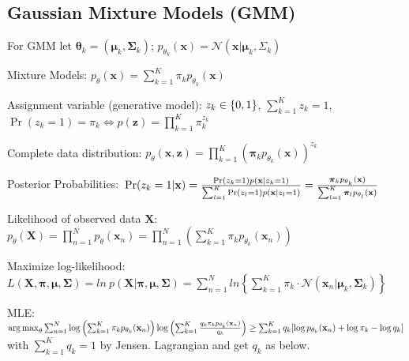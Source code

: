 \documentclass[a4paper, 11pt, landscape]{article}
\DeclareMathOperator*{\argmax}{arg\,max}
\begin{document}
\begin{multicols*}{3}
\section{Gaussian Mixture Models (GMM)}
For GMM let $\boldsymbol{\theta}_k = (\boldsymbol{\mu}_k, \boldsymbol{\Sigma}_k)$; $p_{\theta_k}(\mathbf{x}) = \mathcal{N}(\mathbf{x} | \boldsymbol{\mu}_k, \Sigma_k)$
\begin{compactdesc}
	\item[Mixture Models:] $p_\theta(\mathbf{x}) = \sum_{k=1}^K \pi_k p_{\theta_k}(\mathbf{x})$
	\item[Assignment variable (generative model):] $\\z_k \in \{0, 1\}$, $\sum_{k=1}^K z_k = 1$, $\operatorname{Pr}(z_k = 1) = \pi_k \Leftrightarrow p(\mathbf{z}) = \prod_{k=1}^K \pi_k^{z_k}$
	\item[Complete data distribution:] $p_\theta(\mathbf{x}, \mathbf{z}) = \prod_{k=1}^K \left( \boldsymbol{\pi}_k p_{\theta_k}(\mathbf{x})\right)^{z_k}$
	\item[Posterior Probabilities:] $\\\operatorname{Pr}(z_k = 1 | \mathbf{x}) = \frac{\operatorname{Pr}(z_k = 1) p(\mathbf{x} | z_k = 1)}{\sum_{l=1}^K \operatorname{Pr}(z_l = 1) p(\mathbf{x} | z_l = 1)} = \frac{\boldsymbol{\pi}_k p_{\theta_k}(\mathbf{x})}{\sum_{l=1}^K \boldsymbol{\pi}_l p_{\theta_l}(\mathbf{x})}$
	\item[Likelihood of observed data $\mathbf{X}$:] $p_\theta(\mathbf{X}) = \prod_{n=1}^N p_\theta(\mathbf{x}_n) = \prod_{n=1}^N \left(\sum_{k=1}^K \pi_k p_{\theta_k}(\mathbf{x}_n)\right)$
	\item[Maximize log-likelihood:] $L(\bm{X},\bm{\pi},\bm{\mu},\bm{\Sigma}) = ln\ p(\bm{X}|\bm{\pi},\bm{\mu},\bm{\Sigma}) = \sum^{N}_{n=1}ln \left\{ \sum^{K}_{k=1} \pi_k \cdot \mathcal{N} \left( \bm{x}_n | \bm{\mu}_k, \bm{\Sigma}_k \right)\right\}$
	\item[MLE:] $\argmax_\theta\sum_{n=1}^N \log \left( \sum_{k=1}^K \pi_k p_{\theta_k}(\mathbf{x}_n)\right) \break \log \left( \sum_{k=1}^K{\frac{q_k \pi_k p_{\theta_k}(\mathbf{x}_n)}{q_k}}\right) \ge \sum_{k=1}^K{q_k[\log p_{\theta_k}(\mathbf{x}_n) + \log \pi_k - \log q_k]}$ with $\sum_{k=1}^K{q_k} = 1$ by Jensen. Lagrangian and get $q_k$ as below.
\end{compactdesc}


\end{multicols*}
\end{document}
